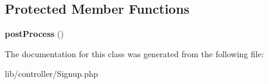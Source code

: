 \subsection*{Protected Member Functions}
\begin{DoxyCompactItemize}
\item 
{\bfseries post\+Process} ()\hypertarget{class_my_app_1_1_controller_1_1_signup_a98b7f8744c8d0a160b655b91208942d5}{}\label{class_my_app_1_1_controller_1_1_signup_a98b7f8744c8d0a160b655b91208942d5}

\end{DoxyCompactItemize}


The documentation for this class was generated from the following file\+:\begin{DoxyCompactItemize}
\item 
lib/controller/Signup.\+php\end{DoxyCompactItemize}
